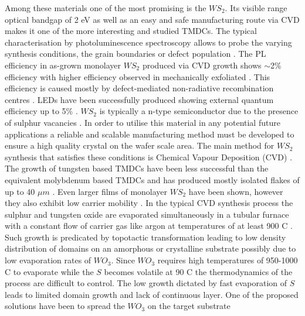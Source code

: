 Among these materials one of the most promising is the $WS_2$. Its visible range optical bandgap of 2 eV as well as an easy and safe manufacturing route via CVD makes it one of the more interesting and studied TMDCs. The typical characterisation by photoluminescence spectroscopy allows to probe the varying synthesis conditions, the grain boundaries or defect population \cite{ExtraordinaryRoomTemperaturePhotoluminescenceInTriangularWS2Monolayers} \cite{doi:10.1021/nn4046002} \cite{Li2015} \cite{Rong2014}. The PL efficiency in as-grown monolayer $WS_2$ produced via CVD growth shows {$\sim$}2\% efficiency with higher efficiency observed in mechanically exfoliated \cite{doi:10.1021/nn4046002}\cite{Yuan2015} \cite{doi:10.1021/nn403682r}. This efficiency is caused mostly by defect-mediated non-radiative recombination centres \cite{Amani2015}. LEDs have been successfully produced \cite{doi:10.1021/nl500171v} showing external quantum efficiency up to 5\% \cite{Zeng2016}\cite{Withers2015}. $WS_2$ is typically a n-type semiconductor due to the presence of sulphur vacancies \cite{ExtraordinaryRoomTemperaturePhotoluminescenceInTriangularWS2Monolayers}\cite{doi:10.1021/nn5059908}\cite{Iqbal2015}. In order to utilise this material in any potential future applications a reliable and scalable manufacturing method must be developed to ensure a high quality crystal on the wafer scale area. The main method for $WS_2$ synthesis that satisfies these conditions is Chemical Vapour Deposition (CVD) \cite{Hofmann1988}. The growth of tungsten based TMDCs have been less successful than the equivalent molybdenum based TMDCs and has produced mostly isolated flakes of up to 40 $\mu m$ \cite{ExtraordinaryRoomTemperaturePhotoluminescenceInTriangularWS2Monolayers} \cite{doi:10.1021/nn403454e} \cite{Rong2014} \cite{doi:10.1021/nn400971k}\cite{doi:10.1021/acsnano.5b01480}\cite{Fu2015}\cite{Lee2013}. Even larger films of monolayer $WS_2$ have been shown, however they also exhibit low carrier mobility \cite{Kang2015}\cite{Gao2015}. In the typical CVD synthesis process the sulphur and tungsten oxide are evaporated simultaneously in a tubular furnace with a constant flow of carrier gas like argon at temperatures of at least 900 {\degree}C \cite{ExtraordinaryRoomTemperaturePhotoluminescenceInTriangularWS2Monolayers}\cite{doi:10.1021/nn403454e}\cite{Rong2014}\cite{doi:10.1021/nn400971k}\cite{doi:10.1021/acsnano.5b01480}\cite{Fu2015}\cite{Lee2013}. Such growth is predicated by topotactic transformation leading to low density distribution of domains on an amorphous \cite{ExtraordinaryRoomTemperaturePhotoluminescenceInTriangularWS2Monolayers}\cite{doi:10.1021/nn403454e}\cite{doi:10.1021/nn400971k}\cite{Fu2015}\cite{Lee2013} or crystalline substrate \cite{Rong2014}\cite{doi:10.1021/acsnano.5b01480}\cite{doi:10.1021/nn503093k} possibly due to low evaporation rates of $WO_3$. Since $WO_3$ requires high temperatures of 950-1000 {\degree}C to evaporate while the $S$ becomes volatile at 90 {\degree}C the thermodynamics of the process are difficult to control. The low growth dictated by fast evaporation of $S$ leads to limited domain growth and lack of continuous layer. One of the proposed solutions have been to spread the $WO_3$ on the target substrate 